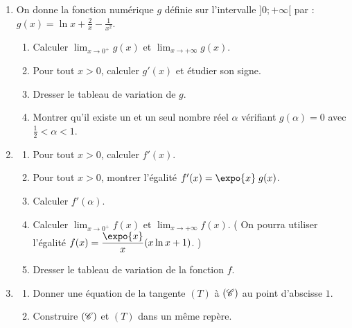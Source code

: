      \begin{enumerate}
            \item On donne la fonction num\'erique $g$ d\'efinie sur l'intervalle $]0;+\infty[$ par : 
                  $\displaystyle{g(x) = \ln x + \frac{2}{x} - \frac{1}{x^2}}$.
                  \label{quest: Bac D 2004 Pbm quest 1}
                  \begin{enumerate}
                        \item Calculer $\displaystyle{\lim_{x\rightarrow 0^+} g(x)}$ et 
                              $\displaystyle{\lim_{x\rightarrow +\infty} g(x)}$.
                        \item Pour tout $x > 0$, calculer $g'(x)$ et \'etudier son signe.
                        \item Dresser le tableau de variation de $g$.
                        \item Montrer qu'il existe un et un seul nombre r\'eel $\alpha$ v\'erifiant $g(\alpha) = 0$
                              avec $\frac{1}{2} < \alpha < 1$.
                        \label{quest: Bac D 2004 Pbm quest 1/ d)}
                  \end{enumerate}
            \item \begin{enumerate}
                        \item Pour tout $x > 0$, calculer $f'(x)$.
                        \item Pour tout $x > 0$, montrer l'\'egalit\'e $f'(x) = \expo{x} \; g(x)$.
                        \item Calculer $f'(\alpha)$.
                        \item Calculer $\displaystyle{\lim_{x\rightarrow 0^+} f(x)}$ et 
                              $\displaystyle{\lim_{x\rightarrow +\infty} f(x)}$.
                              \Big( 
                                    On pourra utiliser l'\'egalit\'e $\displaystyle{f(x) = \frac{\expo{x}}{x} (x \ln x + 1)}$.
                              \Big)
                        \item Dresser le tableau de variation de la fonction $f$.
                  \end{enumerate}
            \item \begin{enumerate}
                        \item Donner une \'equation de la tangente $(T)$ \`a $(\mathscr{C})$ au point d'abscisse $1$.
                        \item Construire $(\mathscr{C})$ et $(T)$ dans un m\^eme rep\`ere.

\end{enumerate}
\end{enumerate}
